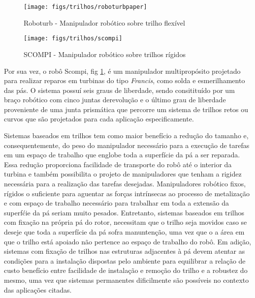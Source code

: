 \begin{figure}[!htb]
	\centering
    \begin{minipage}[b]{0.45\linewidth}	
		\texttt{[image: figs/trilhos/roboturbpaper]}
		\caption{Roboturb - Manipulador robótico sobre trilho flexível}
		\label{fig::roboturb}
	\end{minipage}
	\begin{minipage}[b]{0.45\linewidth}
		\texttt{[image: figs/trilhos/scompi]}
		\caption{SCOMPI - Manipulador robótico sobre trilhos rígidos}
		\label{fig::scompi}
	\end{minipage}
\end{figure}

Por sua vez, o robô Scompi, fig \ref{fig::scompi}, é um manipulador
multipropósito projetado para realizar reparos em turbinas do tipo \textit{Francis},
 como solda e esmerilhamento das pás. O sistema possuí seis graus de liberdade, sendo 
consitituído por um braço robótico com cinco juntas derevolução e o último grau
 de liberdade proveniente de uma junta prismática que percorre um sistema de 
 trilhos retos ou curvos que são projetados para cada aplicação especificamente. 


Sistemas baseados em trilhos tem como maior benefício a redução do tamanho e,
consequentemente, do peso do manipulador necessário para a execução de tarefas
em um espaço de trabalho que englobe toda a superfície da pá a ser reparada.
Essa redução proporciona facilidade de transporte do robô até o interior da
turbina e também possibilita o projeto de manipuladores que tenham a rigidez
necessária para a realização das tarefas desejadas. Manipuladores
robótico fixos, rígidos o suficiente para aguentar as forças intrínsecas ao
processo de metalização e com espaço de trabalho necessário para trabalhar em
toda a extensão da superfćie da pá seriam muito pesados.
Entretanto, sistemas baseados em trilhos com fixação na própria pá do rotor, necessitam que
o trilho seja movidos caso se deseje que toda a superfície da pá sofra
manuntenção, uma vez que o a área em que o trilho está apoiado não pertence ao espaço de
trabalho do robô. Em adição, sistemas com fixação de trilhos nas estruturas
adjacentes à pá devem atentar as condições para a instalação dispostas pelo
ambiente para equilibrar a relação de custo benefício entre facilidade de
instalação e remoção do trilho e a robustez do mesmo, uma vez que sistemas
permanentes dificilmente são possíveis no contexto das aplicações citadas.

